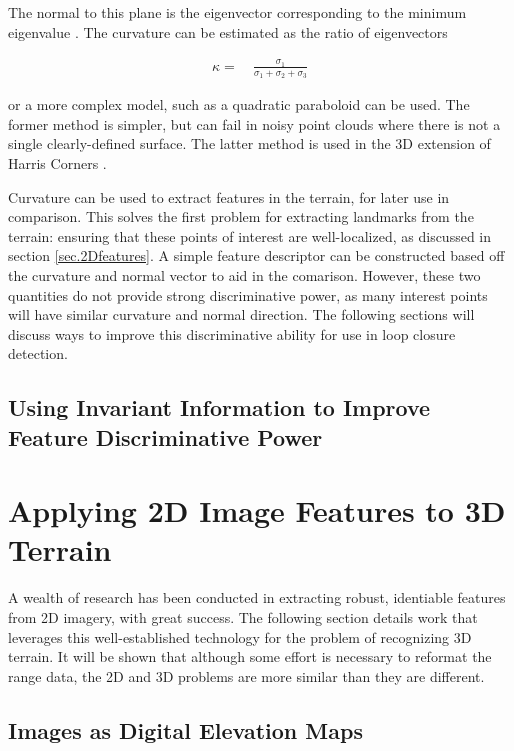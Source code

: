 The normal to this plane is the eigenvector corresponding to the minimum eigenvalue \cite{?}. The curvature can be estimated as the ratio of eigenvectors

\begin{align} %
   \kappa = ~&\frac{\sigma_{1}}{\sigma_{1}+\sigma_{2}+\sigma_{3}} 
\end{align}

or a more complex model, such as a quadratic paraboloid can be used. The former method is simpler, but can fail in noisy point clouds where there is not a single clearly-defined surface. The latter method is used in the 3D extension of Harris Corners \cite{Harris3D}.

Curvature can be used to extract features in the terrain, for later use in comparison. This solves the first problem for extracting landmarks from the terrain: ensuring that these points of interest are well-localized, as discussed in section \ref{sec.2Dfeatures}.  A simple feature descriptor can be constructed based off the curvature and normal vector to aid in the comarison. However, these two quantities do not provide strong discriminative power, as many interest points will have similar curvature and normal direction. The following sections will discuss ways to improve this discriminative ability for use in loop closure detection. 

\subsection{Using Invariant Information to Improve Feature Discriminative Power} 



\section{Applying 2D Image Features to 3D Terrain}

A wealth of research has been conducted in extracting robust, identiable features from 2D imagery, with great success. The following section details work that leverages this well-established technology for the problem of recognizing 3D terrain. It will be shown that although some effort is necessary to reformat the range data, the 2D and 3D problems are more similar than they are different.

\subsection{Images as Digital Elevation Maps}

